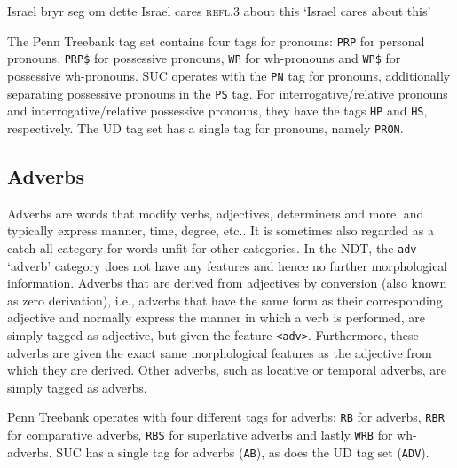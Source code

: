 \documentclass[a4paper,12pt,english]{book}
\begin{document}
\begin{examples}
\item \gll Israel bryr seg om dette
    Israel cares \textsc{refl.\small{3}} about this
    \glt `Israel cares about this'
    \glend
    \label{exrefl2}
\end{examples}


The Penn Treebank tag set contains four tags for pronouns: \texttt{PRP} for
personal pronouns, \texttt{PRP\$} for possessive pronouns, \texttt{WP} for
wh-pronouns  and \texttt{WP\$} for possessive wh-pronouns.  SUC operates with
the \texttt{PN} tag for pronouns, additionally separating possessive pronouns
in the \texttt{PS} tag. For interrogative/relative pronouns and
interrogative/relative possessive pronouns, they have the tags \texttt{HP} and
\texttt{HS}, respectively. The UD tag set has a single tag for pronouns,
namely \texttt{PRON}.

\subsection{Adverbs}
Adverbs are words that modify verbs, adjectives, determiners and more, and
typically express manner, time, degree, etc.. It is sometimes also regarded as
a catch-all category for words unfit for other categories. In the NDT, the
\texttt{adv} `adverb' category does not have any features and hence no further
morphological information. Adverbs that are derived from adjectives by
conversion (also known as zero derivation), i.e., adverbs that have the same
form as their corresponding adjective and normally express the manner in which
a verb is performed, are simply tagged as adjective, but given the feature
\texttt{<adv>}. Furthermore, these adverbs are given the exact same
morphological features as the adjective from which they are derived. Other
adverbs, such as locative or temporal adverbs, are simply tagged as adverbs.

Penn Treebank operates with four different tags for adverbs: \texttt{RB} for
adverbs, \texttt{RBR} for comparative adverbs, \texttt{RBS} for superlative
adverbs and lastly \texttt{WRB} for wh-adverbs. SUC has a single tag for
adverbs (\texttt{AB}), as does the UD tag set (\texttt{ADV}).
\end{document}
